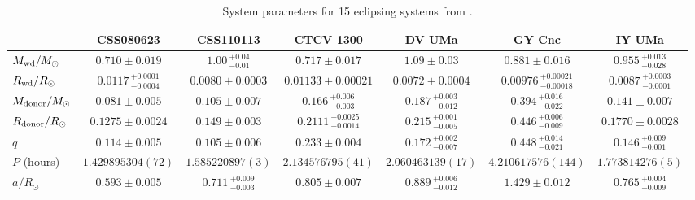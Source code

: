 \begin{landscape}
    \begin{table}
        \caption{System parameters for 15 eclipsing systems from \citet{McAllister2019}.}
        \label{appendix:table:mcallister system params}
        \begin{tabular}{lcccccc}
            \hline
            ~                           & \textbf{CSS080623}                & \textbf{CSS110113}        & \textbf{CTCV 1300}                & \textbf{DV UMa}               & \textbf{GY Cnc}                   & \textbf{IY UMa}                   \\
            \hline
            \hline
            $M_{\rm wd}/M_{\odot}$      & $0.710\pm0.019$                   & $1.00\,^{+0.04}_{-0.01}$  & $0.717\pm0.017$                   & $1.09\pm0.03$                 & $0.881\pm0.016$                   & $0.955\,^{+0.013}_{-0.028}$       \\
            $R_{\rm wd}/R_{\odot}$      & $0.0117\,^{+0.0001}_{-0.0004}$    & $0.0080\pm0.0003$         & $0.01133\pm0.00021$               & $0.0072\pm0.0004$             & $0.00976\,^{+0.00021}_{-0.00018}$ & $0.0087\,^{+0.0003}_{-0.0001}$    \\
            $M_{\rm donor}/M_{\odot}$   & $0.081\pm0.005$                   & $0.105\pm0.007$           & $0.166\,^{+0.006}_{-0.003}$       & $0.187\,^{+0.003}_{-0.012}$   & $0.394\,^{+0.016}_{-0.022}$       & $0.141\pm0.007$                   \\
            $R_{\rm donor}/R_{\odot}$   & $0.1275\pm0.0024$                 & $0.149\pm0.003$           & $0.2111\,^{+0.0025}_{-0.0014}$    & $0.215\,^{+0.001}_{-0.005}$   & $0.446\,^{+0.006}_{-0.009}$       & $0.1770\pm0.0028$                 \\
            $q$                         & $0.114\pm0.005$                   & $0.105\pm0.006$           & $0.233\pm0.004$                   & $0.172\,^{+0.002}_{-0.007}$   & $0.448\,^{+0.014}_{-0.021}$       & $0.146\,^{+0.009}_{-0.001}$       \\
            \hline
            $P$ (hours)                 & $1.429895304(72)$                 & $1.585220897(3)$          & $2.134576795(41)$                 & $2.060463139(17)$             & $4.210617576(144)$                & $1.773814276(5)$                  \\
            $a/R_{\odot}$               & $0.593\pm0.005$                   & $0.711\,^{+0.009}_{-0.003}$   & $0.805\pm0.007$               & $0.889\,^{+0.006}_{-0.012}$   & $1.429\pm0.012$                   & $0.765\,^{+0.004}_{-0.009}$       \\

\end{tabular}
\end{table}
\end{landscape}
